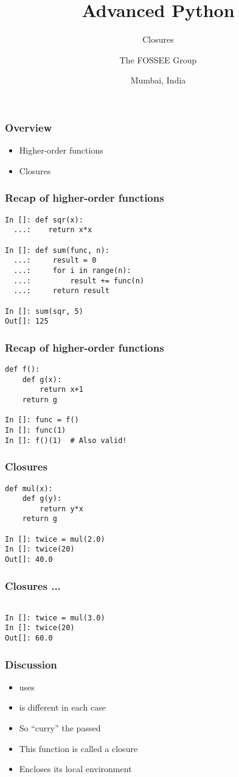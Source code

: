 \documentclass[14pt,compress]{beamer}
\title[Closures]{Advanced Python}
\subtitle{Closures}
\author[FOSSEE] {The FOSSEE Group}
\institute[IIT Bombay] {Department of Aerospace Engineering\\IIT Bombay}
\date[] {Mumbai, India}
\begin{document}
\begin{frame}
  \titlepage
\end{frame}

\begin{frame}
  \frametitle{Overview}
  \begin{itemize}
  \item Higher-order functions
  \item Closures
  \end{itemize}
\end{frame}

\begin{frame}[fragile]
  \frametitle{Recap of higher-order functions}
  \begin{lstlisting}
In []: def sqr(x):
  ...:    return x*x

In []: def sum(func, n):
  ...:     result = 0
  ...:     for i in range(n):
  ...:         result += func(n)
  ...:     return result

In []: sum(sqr, 5)
Out[]: 125
  \end{lstlisting}
\end{frame}

\begin{frame}[fragile]
  \frametitle{Recap of higher-order functions}
  \begin{lstlisting}
def f():
    def g(x):
        return x+1
    return g

In []: func = f()
In []: func(1)
In []: f()(1)  # Also valid!
  \end{lstlisting}
\end{frame}


\begin{frame}[fragile]
  \frametitle{Closures}
  \begin{lstlisting}
def mul(x):
    def g(y):
        return y*x
    return g

In []: twice = mul(2.0)
In []: twice(20)
Out[]: 40.0
  \end{lstlisting}
\end{frame}

\begin{frame}[fragile]
  \frametitle{Closures ...}
  \begin{lstlisting}

In []: twice = mul(3.0)
In []: twice(20)
Out[]: 60.0
  \end{lstlisting}
\end{frame}

\begin{frame}
  \frametitle{Discussion}
  \begin{itemize}
  \item {} uses 
  \item {} is different in each case
  \item So  ``curry'' the passed 
  \item This function is called a closure
  \item Encloses its local environment
  \end{itemize}
\end{frame}
\end{document}
